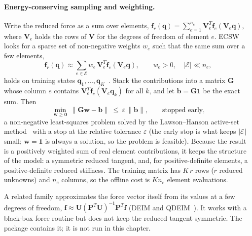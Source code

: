 \paragraph{Energy-conserving sampling and weighting.}
Write the reduced force as a sum over elements, $\bm f_r(\bm q)=\sum_{e=1}^{n_e}\bm V_e^T\bm f_e(\bm V_e\bm q)$, where $\bm V_e$ holds the rows of $\bm V$ for the degrees of freedom of element $e$. ECSW looks for a sparse set of non-negative weights $w_e$ such that the same sum over a few elements,
\begin{equation}\label{eq:hy-ecsw}
\bm f_r(\bm q)\approx\sum_{e\in\mathcal E}w_e\,\bm V_e^T\bm f_e(\bm V_e\bm q),\qquad w_e>0,\quad |\mathcal E|\ll n_e,
\end{equation}
holds on training states $\bm q_1,\dots,\bm q_K$~\cite{farhat2014ecsw,farhat2015ecsw}. Stack the contributions into a matrix $\bm G$ whose column $e$ contains $\bm V_e^T\bm f_e(\bm V_e\bm q_k)$ for all $k$, and let $\bm b=\bm G\bm 1$ be the exact sum. Then
\begin{equation}\label{eq:hy-nnls}
\min_{\bm w\ge\bm 0}\ \|\bm G\bm w-\bm b\|\ \le\ \varepsilon\,\|\bm b\|,\qquad \text{stopped early,}
\end{equation}
a non-negative least-squares problem solved by the Lawson--Hanson active-set method~\cite{lawson1995lsq} with a stop at the relative tolerance $\varepsilon$ (the early stop is what keeps $|\mathcal E|$ small; $\bm w=\bm 1$ is always a solution, so the problem is feasible). Because the result is a positively weighted sum of real element contributions, it keeps the structure of the model: a symmetric reduced tangent, and, for positive-definite elements, a positive-definite reduced stiffness. The training matrix has $K\,r$ rows ($r$ reduced unknowns) and $n_e$ columns, so the offline cost is $K n_e$ element evaluations.

A related family approximates the force vector itself from its values at a few degrees of freedom, $\bm f\approx\bm U(\bm P^T\bm U)^{-1}\bm P^T\bm f$ (DEIM and QDEIM~\cite{chaturantabut2010deim,drmac2016qdeim}). It works with a black-box force routine but does not keep the reduced tangent symmetric. The package contains it; it is not run in this chapter.

